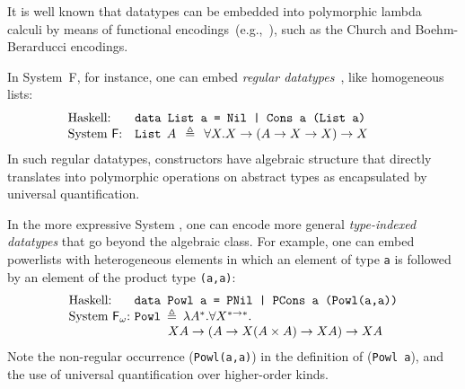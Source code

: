 It is well known that datatypes can be embedded into polymorphic lambda
calculi by means of functional encodings~(e.g.,~\cite{AbeMatUus03}), such
as the Church and Boehm-Berarducci encodings.

In System~\textsf{F}, for instance, one can embed \emph{regular
datatypes}~\cite{BoehmBerarducci}, like homogeneous lists:
\[\!\!\!\!\!\!\!\!\!
\begin{array}{ll}
\text{Haskell:} & \texttt{data List a = Nil | Cons a (List a)} \\
\text{System \textsf{F}:} & \texttt{{List}}\:\: A\:\:\triangleq\:\:\forall X.X\to(A\to X\to X)\to X ~~\;
\end{array}
\]
In such regular datatypes, constructors have algebraic structure that
directly translates into polymorphic operations on abstract types as
encapsulated by universal quantification.

In the more expressive System \Fw, one can encode more general
\emph{type-indexed datatypes} that go beyond the algebraic class.
For example, one can embed powerlists with
heterogeneous elements in which an element of type \texttt{a} is followed by
an element of the product type \texttt{(a,a)}:
\[
\begin{array}{ll}
\text{Haskell:} & \!\!\!\!\texttt{data Powl a = PNil | PCons a (Powl(a,a))} \\
\text{System \Fw:} & \!\!\!\!\texttt{{Powl}}\:\triangleq\:
\lambda A^{*}.\forall X^{*\to*}.\\ \qquad
& \qquad X A\to (A\to X(A\times A)\to X A)\to XA
\end{array}
\]
Note the non-regular occurrence (\texttt{Powl(a,a)}) in the definition of
(\texttt{Powl a}), and the use of universal quantification over
higher-order kinds.


